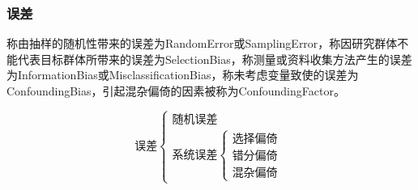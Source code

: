 \subsubsection{误差}
\begin{definition}
	称由抽样的随机性带来的误差为\gls{RandomError}或\gls{SamplingError}，称因研究群体不能代表目标群体所带来的误差为\gls{SelectionBias}，称测量或资料收集方法产生的误差为\gls{InformationBias}或\gls{MisclassificationBias}，称未考虑变量致使的误差为\gls{ConfoundingBias}，引起混杂偏倚的因素被称为\gls{ConfoundingFactor}。
\end{definition}
\begin{center}
	\begin{equation*}
		\text{误差}
		\begin{cases}
			\text{随机误差} \\
			\text{系统误差}
			\begin{cases}
				\text{选择偏倚} \\
				\text{错分偏倚} \\
				\text{混杂偏倚}
			\end{cases}
		\end{cases}
	\end{equation*}
\end{center}






